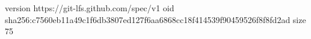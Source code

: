 version https://git-lfs.github.com/spec/v1
oid sha256:c7560eb11a49c1f6db3807ed127f6aa6868cc18f414539f90459526f8f8fd2ad
size 75
